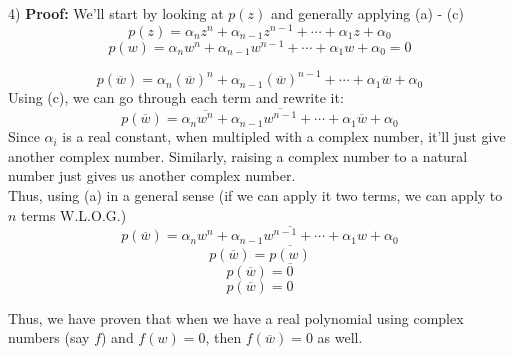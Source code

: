 \begin{paragraph}{4)}
        \textbf{Proof:} We'll start by looking at $p(z)$ and generally applying (a) - (c)
        $$p(z) = \alpha_nz^n + \alpha_{n-1}z^{n-1} + \cdots +\alpha_1z + \alpha_0$$
        $$p(w) = \alpha_nw^n + \alpha_{n-1}w^{n-1} + \cdots + \alpha_1w + \alpha_0 = 0$$ 
        \begin{center}
            \separate
        \end{center}
        $$p(\overline{w}) = \alpha_n(\overline{w})^n + \alpha_{n-1}(\overline{w})^{n-1} + \cdots +\alpha_1\overline{w} + \alpha_0$$
        Using (c), we can go through each term and rewrite it:
        $$p(\overline{w}) = \alpha_n\overline{w^n} + \alpha_{n-1}\overline{w^{n-1}} + \cdots + \alpha_1\overline{w} + \alpha_0$$
        Since $\alpha_i$ is a real constant, when multipled with a complex number, it'll just give another complex number.
        Similarly, raising a complex number to a natural number just gives us another complex number.\\ Thus, using (a)
        in a general sense (if we can apply it two terms, we can apply to $n$ terms W.L.O.G.)
        $$p(\overline{w}) = \overline{\alpha_nw^n + \alpha_{n-1}w^{n-1} + \cdots +\alpha_1w + \alpha_0}$$
        $$p(\overline{w}) = \overline{p(w)}$$
        $$p(\overline{w}) = \overline{0}$$
        $$p(\overline{w}) = 0$$

        Thus, we have proven that when we have a real polynomial using complex
        numbers (say $f$) and $f(w) = 0$, then $f(\overline{w}) = 0$ as well.\\ 
        \proofEnd
    \end{paragraph}

